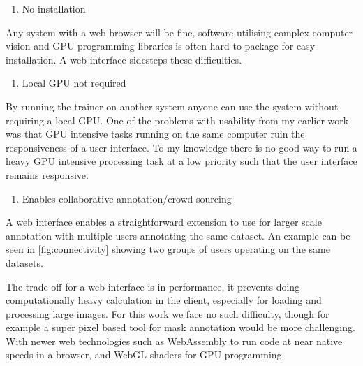 \begin{enumerate}
    \item No installation
\end{enumerate}
Any system with a web browser will be fine, software utilising complex computer vision and GPU programming libraries is often hard to package for easy installation. A web interface sidesteps these difficulties.
\begin{enumerate}[resume]
    \item Local GPU not required
\end{enumerate}
By running the trainer on another system anyone can use the system without requiring a local GPU. One of the problems with usability from my earlier work was that GPU intensive tasks running on the same computer ruin the responsiveness of a user interface. To my knowledge there is no good way to run a heavy \gls{GPU} intensive processing task at a low priority such that the user interface remains responsive.
\begin{enumerate}[resume]
    \item Enables collaborative annotation/crowd sourcing
\end{enumerate}
A web interface enables a straightforward extension to use for larger scale annotation with multiple users annotating the same dataset. An example can be seen in \ref{fig:connectivity} showing two groups of users operating on the same datasets.


The trade-off for a web interface is in performance, it prevents doing computationally heavy calculation in the client, especially for loading and processing large images. For this work we face no such difficulty, though for example a super pixel based tool for mask annotation would be more challenging. With newer web technologies such as WebAssembly \cite{Haas2017} to run code at near native speeds in a browser, and WebGL shaders for GPU programming.

